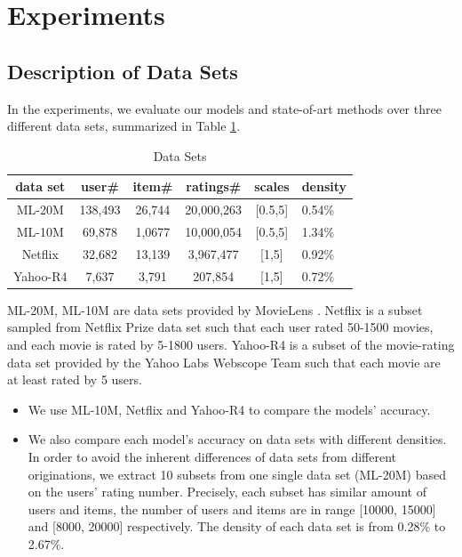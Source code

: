 \documentclass[conference]{IEEEtran}
\begin{document}
\section{Experiments}

\label{experiments}
\subsection{Description of Data Sets}
In the experiments, we evaluate our models and state-of-art methods over three different data sets, summarized in Table \ref{dataset-table}.

\begin{table}[h!]
\centering
\caption{Data Sets}
\hspace*{-0.3cm}
\begin{tabular}{|c|c|c|c|c|l|} \hline
data set & user\# & item\# & ratings\# &scales & density \\ \hline
ML-20M  & 138,493 & 26,744 &20,000,263&[0.5,5] & 0.54\%\\ \hline
ML-10M  & 69,878 & 1,0677 &10,000,054&[0.5,5] & 1.34\%\\ \hline
Netflix & 32,682 & 13,139 &3,967,477&[1,5] & 0.92\% \\
\hline
Yahoo-R4 & 7,637& 3,791&207,854&[1,5] & 0.72\%\\
\hline\end{tabular}

\label{dataset-table}
\end{table}

ML-20M, ML-10M are data sets provided by MovieLens \cite{ml1020m}. Netflix is a subset sampled from Netflix Prize data set \cite{netflix1} such that each user rated 50-1500 movies, and each movie is rated by 5-1800 users. Yahoo-R4 is a subset of the movie-rating data set provided by the Yahoo Labs Webscope Team \cite{yahoor4} such that each movie are at least rated by 5 users.
\begin{itemize}
\item We use ML-10M, Netflix and Yahoo-R4 to compare the models' accuracy.
\item We also compare each model's accuracy on data sets with different densities. In order to avoid the inherent differences of data sets from different originations, we extract 10 subsets from one single data set (ML-20M) based on the users' rating number. Precisely, each subset has similar amount of users and items, the number of users and items are in range [10000,  15000] and [8000, 20000] respectively. The density of each data set is from 0.28\% to 2.67\%.
\end{itemize}
\end{document}
